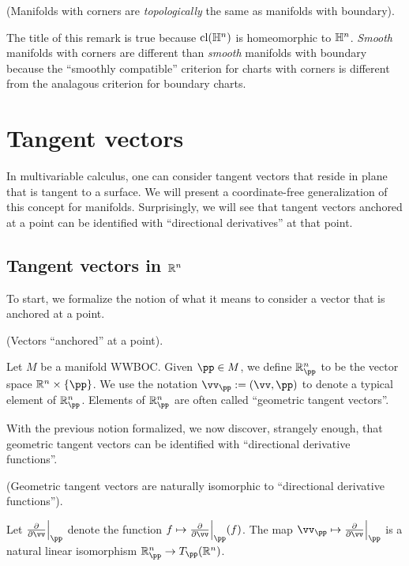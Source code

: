 \begin{remark}
     (Manifolds with corners are \textit{topologically} the same as manifolds with boundary).
    
    The title of this remark is true because $\text{cl}(\mathbb{H}^n)$ is homeomorphic to $\mathbb{H}^n$. \textit{Smooth} manifolds with corners are different than \textit{smooth} manifolds with boundary because the ``smoothly compatible'' criterion for charts with corners is different from the analagous criterion for boundary charts.
\end{remark}

\newpage

\section{Tangent vectors}

In multivariable calculus, one can consider tangent vectors that reside in plane that is tangent to a surface. We will present a coordinate-free generalization of this concept for manifolds. Surprisingly, we will see that tangent vectors anchored at a point can be identified with ``directional derivatives'' at that point.

\subsection*{Tangent vectors in $\mathbb{R}^n$}

To start, we formalize the notion of what it means to consider a vector that is anchored at a point.

\begin{defn}
     (Vectors ``anchored'' at a point).
    
    Let $M$ be a manifold WWBOC. Given $\pp \in M$, we define $\R^n_\pp$ to be the vector space $\R^n \times \{\pp\}$. We use the notation $\vv_\pp := (\vv, \pp)$ to denote a typical element of $\R^n_\pp$. Elements of $\R^n_\pp$ are often called ``geometric tangent vectors''.
\end{defn}

With the previous notion formalized, we now discover, strangely enough, that geometric tangent vectors can be identified with ``directional derivative functions''.

\begin{theorem}
    \label{ch::manifolds::thm::geometric_tangent_vectors_iso_directional_derivative_functions}
    (Geometric tangent vectors are naturally isomorphic to ``directional derivative functions'').
    
     Let $\frac{\pd}{\pd \vv}\Big|_\pp$ denote the function $f \mapsto \frac{\pd}{\pd \vv}\Big|_\pp (f)$. The map $\vv_\pp \mapsto \frac{\pd}{\pd \vv}\Big|_\pp$ is a natural linear isomorphism $\R^n_\pp \rightarrow T_\pp(\R^n)$.
\end{theorem}

